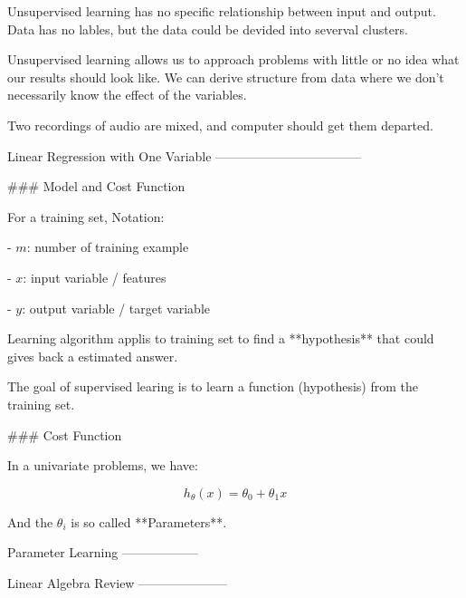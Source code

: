 \documentclass{article}
\begin{document}
\begin{markdown}
Unsupervised learning has no specific relationship between input and
output. Data has no lables, but the data could be devided into severval
clusters.

Unsupervised learning allows us to approach problems with little or no
idea what our results should look like. We can derive structure from
data where we don’t necessarily know the effect of the variables.

Two recordings of audio are mixed, and computer should get them
departed.

Linear Regression with One Variable
-----------------------------------

### Model and Cost Function

For a training set, Notation:

-   $m$: number of training example

-   $x$: input variable / features

-   $y$: output variable / target variable

Learning algorithm applis to training set to find a **hypothesis** that
could gives back a estimated answer.

The goal of supervised learing is to learn a function (hypothesis) from
the training set.

### Cost Function

In a univariate problems, we have:

$$h_\theta(x) = \theta_0 + \theta_1 x$$

And the $\theta_i$ is so called **Parameters**.

Parameter Learning
------------------

Linear Algebra Review
---------------------


\end{markdown}
    
\end{document}
